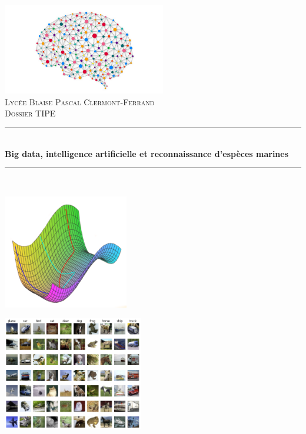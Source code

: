 \documentclass[12pt,a4paper]{extarticle}
\newcommand{\HRule}{\rule{\linewidth}{0.5mm}}
\begin{document}
\begin{titlepage}
  \begin{sffamily}
  \begin{center}


    \includegraphics[height=4cm]{brain}~\\[1.5cm]

    \textsc{\LARGE Lycée Blaise Pascal Clermont-Ferrand}\\[2cm]
    
    

    \textsc{\Large Dossier TIPE}\\[1.5cm]

    \HRule \\[0.4cm]
    { \huge \bfseries Big data, intelligence artificielle et reconnaissance d'espèces marines\\[0.4cm] }

 \HRule \\[2cm]
\begin{minipage}[c]{.46\linewidth}
        \centering
        \includegraphics[height=5cm]{curve}
    \end{minipage}
    \hfill%
    \begin{minipage}[c]{.46\linewidth}
        \centering
        \includegraphics[height=5cm]{CIFAR-10_examples}
    \end{minipage}\\[2cm]
    

\end{center}
\end{sffamily}
\end{titlepage}
\end{document}

